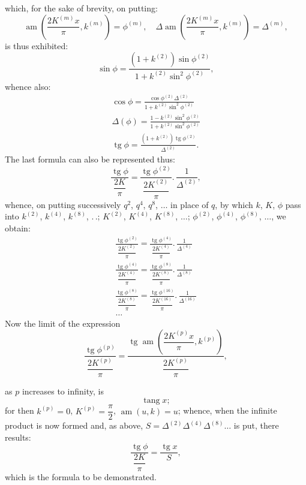 \documentclass{article}
\begin{document}
which, for the sake of brevity, on putting:
\[
\operatorname{am}\left(\frac{2K^{(m)}x}{\pi},k^{(m)}\right)=\phi^{(m)},\quad\Delta\operatorname{am}\left(\frac{2K^{(m)}x}{\pi},k^{(m)}\right)=\Delta^{(m)},
\]
is thus exhibited:
\[
\sin\phi=\frac{(1+k^{(2)})\sin\phi^{(2)}}{1+k^{(2)}\sin^{2}\phi^{(2)}},
\]
whence also:
\[
\begin{gathered}
\cos\phi=\frac{\cos\phi^{(2)}\Delta^{(2)}}{1+k^{(2)}\sin^{2}\phi^{(2)}}
\\[2ex]
\Delta(\phi)=\frac{1-k^{(2)}\sin^{2}\phi^{(2)}}{1+k^{(2)}\sin^{2}\phi^{(2)}}
\\[2ex]
\operatorname{tg}\phi=\frac{(1+k^{(2)})\operatorname{tg}\phi^{(2)}}{\Delta^{(2)}}.
\end{gathered}
\]
The last formula can also be represented thus:
\[
\frac{\operatorname{tg}\phi}{\dfrac{2K}{\pi}}=\frac{\operatorname{tg}\phi^{(2)}}{\dfrac{2K^{(2)}}{\pi}}.\,\frac{1}{\Delta^{(2)}},
\]
whence, on putting successively $q^{2}$, $q^{4}$, $q^{8}$, $\ldots$ in place of $q$, by which $k$, $K$, $\phi$ pass into $k^{(2)}$, $k^{(4)}$, $k^{(8)}$, $.\,.$; $K^{(2)}$, $K^{(4)}$, $K^{(8)}$, $\ldots$; $\phi^{(2)}$, $\phi^{(4)}$, $\phi^{(8)}$, $\ldots$, we obtain:
\[
\begin{gathered}
\frac{\operatorname{tg}\phi^{(2)}}{\dfrac{2K^{(2)}}{\pi}}=\frac{\operatorname{tg}\phi^{(4)}}{\dfrac{2K^{(4)}}{\pi}}.\,\frac{1}{\Delta^{(4)}}
\\[2ex]
\frac{\operatorname{tg}\phi^{(4)}}{\dfrac{2K^{(4)}}{\pi}}=\frac{\operatorname{tg}\phi^{(8)}}{\dfrac{2K^{(8)}}{\pi}}.\,\frac{1}{\Delta^{(8)}}
\\[2ex]
\frac{\operatorname{tg}\phi^{(8)}}{\dfrac{2K^{(8)}}{\pi}}=\frac{\operatorname{tg}\phi^{(16)}}{\dfrac{2K^{(16)}}{\pi}}.\,\frac{1}{\Delta^{(16)}}
\\[2ex]
\ldots
\end{gathered}
\]
Now the limit of the expression
\[
\frac{\operatorname{tg}\phi^{(p)}}{\dfrac{2K^{(p)}}{\pi}}=\frac{\operatorname{tg}\operatorname{am}\left(\dfrac{2K^{(p)}x}{\pi},k^{(p)}\right)}{\dfrac{2K^{(p)}}{\pi}},
\]

as $p$ increases to infinity, is
\[
\operatorname{tang}x;
\]
for then $k^{(p)}=0$, $K^{(p)}=\dfrac{\pi}{2}$, $\operatorname{am}(u,k)=u$; whence, when the infinite product is now formed and, as above, $S=\Delta^{(2)}\Delta^{(4)}\Delta^{(8)}\ldots$ is put, there results:
\[
\frac{\operatorname{tg}\phi}{\dfrac{2K}{\pi}}=\frac{\operatorname{tg}x}{S},
\]
which is the formula to be demonstrated.
\end{document}

